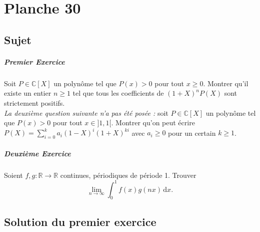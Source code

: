  \chapter{Planche 30}

\section{Sujet}
\paragraph{Premier Exercice}
Soit $P \in  \mathbb{C}[X]$ un polynôme tel que $P(x) > 0$ pour tout $x \geqslant  0$. Montrer qu'il existe un entier $n \geqslant  1$ tel que tous les  coefficients de $(1 + X)^{n} P(X)$ sont strictement positifs.\\
\emph{La deuxième question suivante n'a pas été posée :} soit $P \in  \mathbb{C}[X]$ un polynôme tel que $P(x) > 0$
pour tout $x \in ]  1, 1[$. Montrer qu'on peut écrire $P(X) = \sum _{i=0} ^{k} a_{i} (1 - X)^{i} (1 + X)^{ki}$ avec $a_{i} \geqslant  0$ pour un certain $k \geqslant  1$.

\paragraph{Deuxième Exercice}
Soient $f, g : \mathbb{R} \rightarrow  \mathbb{R}$ continues, périodiques de période 1. Trouver \[\lim _{n\rightarrow \infty } \int _{0} ^{1} f(x)g(nx) \,\mathrm{d}x.\]

\section{Solution du premier exercice}
 
